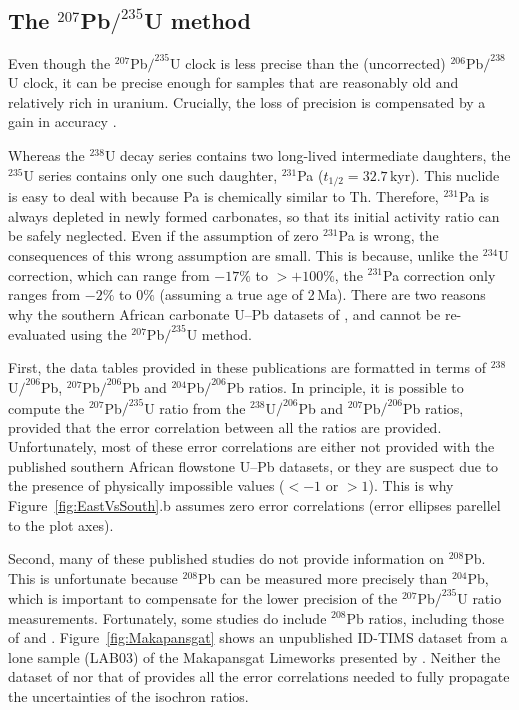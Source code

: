 \documentclass[11pt]{article}
\begin{document}
\subsection{The ${}^{207}$Pb${/}^{235}$U method}\label{sec:Pb207U235}

Even though the ${}^{207}$Pb${/}^{235}$U clock is less precise than
the (uncorrected) ${}^{206}$Pb${/}^{238}$U clock, it can be precise
enough for samples that are reasonably old and relatively rich in
uranium. Crucially, the loss of precision is compensated by a gain in
accuracy \citep{richards1998,vaks2020,engel2019}.

Whereas the ${}^{238}$U decay series contains two long-lived
intermediate daughters, the ${}^{235}$U series contains only one such
daughter, $^{231}$Pa ($t_{1/2}=32.7\,$kyr). This nuclide is easy to
deal with because Pa is chemically similar to Th. Therefore,
$^{231}$Pa is always depleted in newly formed carbonates, so that its
initial activity ratio can be safely neglected.  Even if the
assumption of zero ${}^{231}$Pa is wrong, the consequences of this
wrong assumption are small. This is because, unlike the ${}^{234}$U
correction, which can range from $-17\%$ to $>+100\%$, the
${}^{231}$Pa correction only ranges from $-2\%$ to $0\%$ (assuming a
true age of 2\,Ma). There are two reasons why the southern African
carbonate U--Pb datasets of \citet{pickering2019}, \citet{dirks2010}
and \citet{walker2006} cannot be re-evaluated using the
${}^{207}$Pb${/}^{235}$U method.

First, the data tables provided in these publications are formatted in
terms of ${}^{238}$U${/}^{206}$Pb, ${}^{207}$Pb${/}^{206}$Pb and
${}^{204}$Pb${/}^{206}$Pb ratios.  In principle, it is possible to
compute the ${}^{207}$Pb${/}^{235}$U ratio from the
${}^{238}$U${/}^{206}$Pb and ${}^{207}$Pb${/}^{206}$Pb ratios,
provided that the error correlation between all the ratios are
provided. Unfortunately, most of these error correlations are either
not provided with the published southern African flowstone U--Pb
datasets, or they are suspect due to the presence of physically
impossible values ($<-1$ or $>1$). This is why
Figure~\ref{fig:EastVsSouth}.b assumes zero error correlations (error
ellipses parellel to the plot axes).

Second, many of these published studies do not provide information on
${}^{208}$Pb. This is unfortunate because ${}^{208}$Pb can be measured
more precisely than ${}^{204}$Pb, which is important to compensate for
the lower precision of the ${}^{207}$Pb${/}^{235}$U ratio
measurements. Fortunately, some studies do include ${}^{208}$Pb
ratios, including those of \citet{walker2005} and
\citet{walker2006}. Figure~\ref{fig:Makapansgat} shows an unpublished
ID-TIMS dataset from a lone sample (LAB03) of the Makapansgat
Limeworks presented by \citet{walker2005}. Neither the dataset of
\citet{walker2005} nor that of \citet{walker2006} provides all the
error correlations needed to fully propagate the uncertainties of the
isochron ratios.
\end{document}

